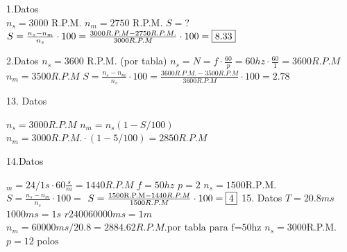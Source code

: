 \documentclass[../main]{subfiles}
\begin{document}
1.Datos\\
$n_s= 3000$ R.P.M.
$n_m=2750$ R.P.M.
$S=$?
$S=\frac{n_s-n_m}{n_s}\cdot 100=\frac{3000 R.P.M-2750
R.P.M.}{3000R.P.M}\cdot 100=\fbox{8.33}$

2.Datos
$n_s=3600$ R.P.M. (por tabla)
$n_s=N=f\cdot \frac{60}{p}=60hz \cdot \frac{60}{1} =3600 R.P.M$
$n_m=3500 R.P.M$
$S=\frac{n_s-n_m}{n_s}\cdot 100=\frac{3600 R.P.M.-3500 R.P.M}{3600
R.P.M}\cdot 100=2.78$

13. Datos

$n_s=3000 R.P.M$
$n_m=n_s(1-S/100)$
$n_m=3000R.P.M. \cdot(1-5/100)=2850 R.P.M$

14.Datos

$_m=24/1s\cdot 60\frac{s}{m}=1440 R.P.M$
$f=50hz$
$p=2$
$n_s=1500 \text{R.P.M.}$
$S=\frac{n_s-n_m}{n_s}\cdot 100=$
$S=\frac{1500 \text{R.P.M}-1440 R.P.M}{1500R.P.M}\cdot 100= \fbox{4}$
15. Datos
$T=20.8ms$
$1000ms = 1s$
$r240060000ms=1m$
$n_m= 60000ms/20.8 = 2884.62R.P.M. \text{por tabla para f=50hz}$
$n_s=3000$R.P.M.
$p=1 \text{2 polos}$
\end{document}
